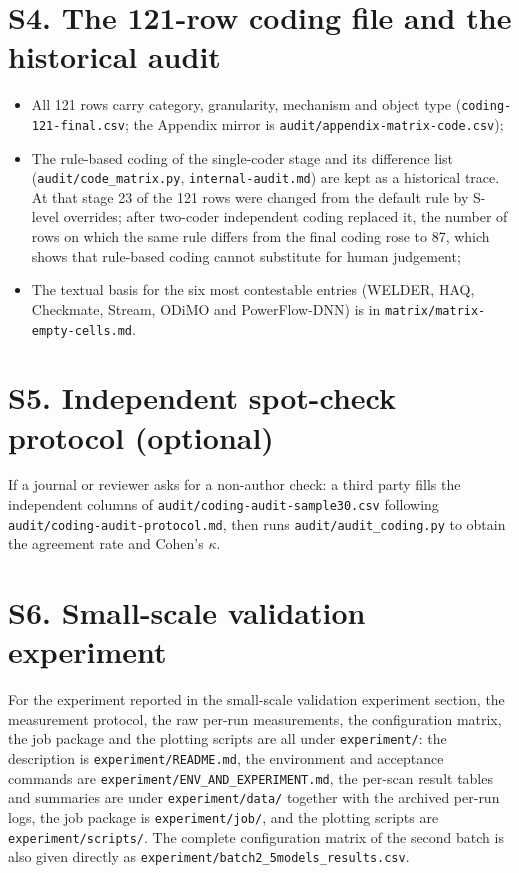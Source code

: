 \documentclass[11pt,a4paper]{article}
\begin{document}
\section{S4. The 121-row coding file and the historical audit}
\begin{itemize}[leftmargin=2em,itemsep=1pt]
  \item All 121 rows carry category, granularity, mechanism and object type
        (\texttt{coding-121-final.csv}; the Appendix mirror is
        \texttt{audit/appendix-matrix-code.csv});
  \item The rule-based coding of the single-coder stage and its difference list
        (\texttt{audit/code\_matrix.py}, \texttt{internal-audit.md}) are kept as a
        historical trace. At that stage 23 of the 121 rows were changed from the
        default rule by S-level overrides; after two-coder independent coding
        replaced it, the number of rows on which the same rule differs from the
        final coding rose to 87, which shows that rule-based coding cannot
        substitute for human judgement;
  \item The textual basis for the six most contestable entries (WELDER, HAQ,
        Checkmate, Stream, ODiMO and PowerFlow-DNN) is in
        \texttt{matrix/matrix-empty-cells.md}.
\end{itemize}

\section{S5. Independent spot-check protocol (optional)}
If a journal or reviewer asks for a non-author check: a third party fills the independent columns of \texttt{audit/coding-audit-sample30.csv} following \texttt{audit/coding-audit-protocol.md}, then runs \texttt{audit/audit\_coding.py} to obtain the agreement rate and Cohen's $\kappa$.

\section{S6. Small-scale validation experiment}
For the experiment reported in the small-scale validation experiment section, the measurement protocol, the raw per-run measurements, the configuration matrix, the job package and the plotting scripts are all under \texttt{experiment/}: the description is \texttt{experiment/README.md}, the environment and acceptance commands are \texttt{experiment/ENV\_AND\_EXPERIMENT.md}, the per-scan result tables and summaries are under \texttt{experiment/data/} together with the archived per-run logs, the job package is \texttt{experiment/job/}, and the plotting scripts are \texttt{experiment/scripts/}. The complete configuration matrix of the second batch is also given directly as \texttt{experiment/batch2\_5models\_results.csv}.
\end{document}
